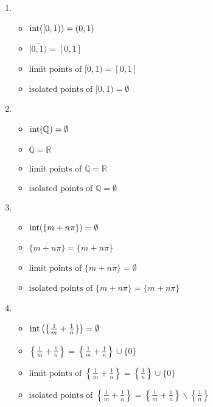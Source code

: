 \documentclass{article}
\def\int{\mathop{\rm int}\nolimits}
\begin{document}
\begin{enumerate}
\begin{itemize}
\begin{enumerate}
\item
\begin{itemize}
\item \(\int([0,1)) = (0,1)\)
\item \(\overline{[0,1)} = [0,1]\)
\item \(\text{limit points of } [0,1) = [0,1]\)
\item \(\text{isolated points of } [0,1) = \emptyset\)
\end{itemize}
\item
\begin{itemize}
\item \(\int(\mathbb{Q}) = \emptyset\)
\item \(\overline{\mathbb{Q}} = \mathbb{R}\)
\item \(\text{limit points of } \mathbb{Q} = \mathbb{R}\)
\item \(\text{isolated points of } \mathbb{Q} = \emptyset\)
\end{itemize}
\item
\begin{itemize}
\item \(\int(\{m + n \pi\}) = \emptyset\)
\item \(\overline{\{m + n \pi\}} = \{m + n \pi\}\)
\item \(\text{limit points of } \{m + n \pi\} = \emptyset\)
\item \(\text{isolated points of } \{m + n \pi\} = \{m + n \pi\}\)
\end{itemize}
\item
\begin{itemize}
\item \(\int \left( \left\{ \frac{1}{m} + \frac{1}{n} \right\} \right) = \emptyset\)
\item \(\overline{ \left\{ \frac{1}{m} + \frac{1}{n} \right\} } = \left\{ \frac{1}{m} + \frac{1}{n} \right\} \cup \{0\}\)
\item \(\text{limit points of } \left\{ \frac{1}{m} + \frac{1}{n} \right\} = \left\{ \frac{1}{n} \right\} \cup \{0\}\)
\item \(\text{isolated points of } \left\{ \frac{1}{m} + \frac{1}{n} \right\} = \left\{ \frac{1}{m} + \frac{1}{n} \right\} \backslash \left\{ \frac{1}{n} \right\}\)
\end{itemize}
\end{enumerate}



\end{itemize}

\end{enumerate}
\end{document}
